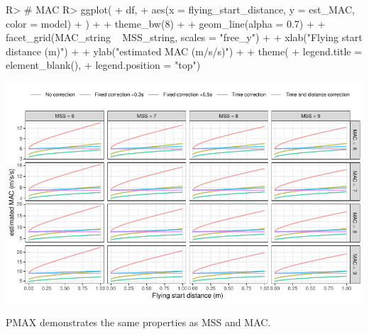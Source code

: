 \documentclass[
]{jss}
\begin{document}
\begin{CodeChunk}
\begin{CodeInput}
R> # MAC
R> ggplot(
+   df,
+   aes(x = flying_start_distance, y = est_MAC, color = model)
+ ) +
+   theme_bw(8) +
+   geom_line(alpha = 0.7) +
+   facet_grid(MAC_string ~ MSS_string, scales = "free_y") +
+   xlab("Flying start distance (m)") +
+   ylab("estimated MAC (m/s/s)") +
+   theme(
+     legend.title = element_blank(),
+     legend.position = "top")
\end{CodeInput}


\begin{center}\includegraphics[width=1\linewidth]{paper_files/figure-latex/unnamed-chunk-33-1} \end{center}

\end{CodeChunk}

PMAX demonstrates the same properties as MSS and MAC.
\end{document}
